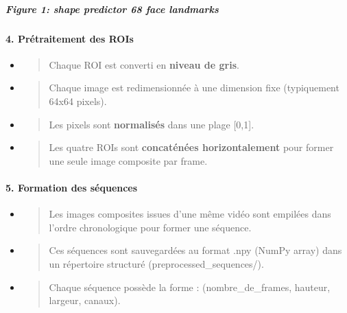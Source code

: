 \documentclass[
]{article}
\begin{document}
\hypertarget{figure-1-shape-predictor-68-face-landmarks}{%
\subparagraph{Figure 1: shape predictor 68 face landmarks}\label{figure-1-shape-predictor-68-face-landmarks}}

\hypertarget{pruxe9traitement-des-rois}{%
\paragraph{\texorpdfstring{\textbf{4. Prétraitement des ROIs}}{4. Prétraitement des ROIs}}\label{pruxe9traitement-des-rois}}

\begin{itemize}
\item
  \begin{quote}
  Chaque ROI est converti en \textbf{niveau de gris}.
  \end{quote}
\item
  \begin{quote}
  Chaque image est redimensionnée à une dimension fixe (typiquement 64x64 pixels).
  \end{quote}
\item
  \begin{quote}
  Les pixels sont \textbf{normalisés} dans une plage {[}0,1{]}.
  \end{quote}
\item
  \begin{quote}
  Les quatre ROIs sont \textbf{concaténées horizontalement} pour former une seule image composite par frame.
  \end{quote}
\end{itemize}

\hypertarget{formation-des-suxe9quences}{%
\paragraph{\texorpdfstring{\textbf{5. Formation des séquences}}{5. Formation des séquences}}\label{formation-des-suxe9quences}}

\begin{itemize}
\item
  \begin{quote}
  Les images composites issues d'une même vidéo sont empilées dans l'ordre chronologique pour former une séquence.
  \end{quote}
\item
  \begin{quote}
  Ces séquences sont sauvegardées au format .npy (NumPy array) dans un répertoire structuré (preprocessed\_sequences/).
  \end{quote}
\item
  \begin{quote}
  Chaque séquence possède la forme : (nombre\_de\_frames, hauteur, largeur, canaux).
  \end{quote}
\end{itemize}
\end{document}
